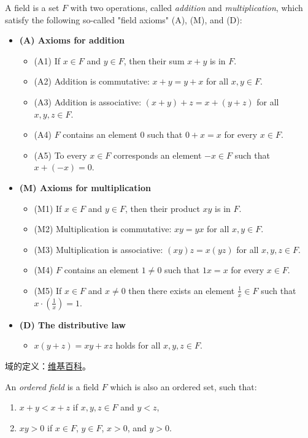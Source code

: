 \documentclass[../poma-notes.tex]{subfiles}
\begin{document}
\begin{definition}
	A field is a set $F$ with two operations, called \textit{addition} and \textit{multiplication},
	which satisfy the following so-called "field axioms" (A), (M), and (D):

	\begin{itemize}
		\item[] \textbf{(A) Axioms for addition}
			\begin{itemize}
				\item[] (A1) If $x \in F$ and $y \in F$, then their sum $x + y$ is in $F$.
				\item[] (A2) Addition is commutative: $x + y = y + x$ for all $x,y \in F$.
				\item[] (A3) Addition is associative: $(x+y)+z=x+(y+z)$ for all $x,y,z \in F$.
				\item[] (A4) $F$ contains an element 0 such that $0+x=x$ for every $x \in F$.
				\item[] (A5) To every $x \in F$ corresponds an element $-x \in F$ such that $x+(-x)=0$.
			\end{itemize}
		\item[] \textbf{(M) Axioms for multiplication}
			\begin{itemize}
				\item[] (M1) If $x \in F$ and $y \in F$, then their product $xy$ is in $F$.
				\item[] (M2) Multiplication is commutative: $xy = yx$ for all $x,y \in F$.
				\item[] (M3) Multiplication is associative: $(xy)z = x(yz)$ for all $x,y,z \in F$.
				\item[] (M4) $F$ contains an element $1 \ne 0$ such that $1x = x$ for every $x \in F$.
				\item[] (M5) If $x \in F$ and $x \ne 0$ then there exists an element $\frac{1}{x} \in F$
					such that $x \cdot (\frac{1}{x}) = 1$.
			\end{itemize}
		\item[] \textbf{(D) The distributive law}
			\begin{itemize}
				\item[] $x(y+z) = xy+xz$ holds for all $x,y,z \in F$.
			\end{itemize}
	\end{itemize}
\end{definition}

\anote
域的定义：\href{https://en.wikipedia.org/wiki/Field_(mathematics)}{维基百科}。

\setcounter{poma}{16}
\begin{definition}
	An \textit{ordered field} is a field $F$ which is also an ordered set, such that:

	\begin{enumerate}
		\item $x+y<x+z$ if $x,y,z \in F$ and $y<z$,
		\item $xy>0$ if $x \in F$, $y \in F$, $x>0$, and $y>0$.
	\end{enumerate}
\end{definition}
\end{document}
